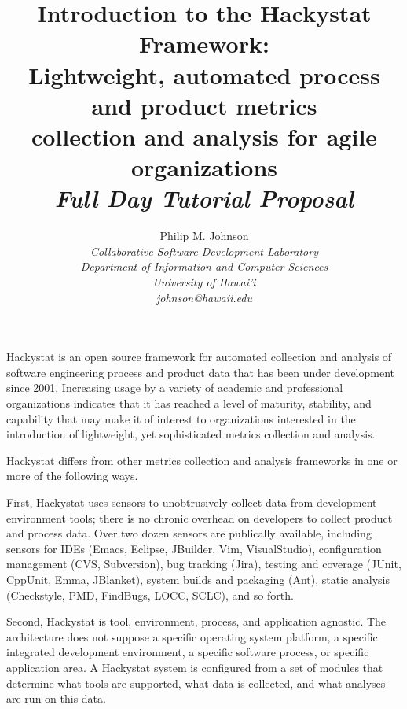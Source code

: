 \documentclass[11pt,twocolumn]{article}
\begin{document}
\title{Introduction to the Hackystat Framework:\\
Lightweight, automated process and product metrics \\
collection and analysis for agile organizations\\ \medskip
\em Full Day Tutorial Proposal}

\author{
Philip M. Johnson\\
\em  Collaborative Software Development Laboratory \\
\em  Department of Information and Computer Sciences \\
\em  University of Hawai'i \\
\em  johnson@hawaii.edu}
\maketitle
\thispagestyle{empty}



Hackystat is an open source framework for automated collection and analysis
of software engineering process and product data that has been under
development since 2001. Increasing usage by a variety of academic and professional 
organizations indicates that it has reached a level of maturity, stability, 
and capability that may make it of interest to organizations interested in 
the introduction of lightweight, yet sophisticated metrics collection and analysis.

Hackystat differs from other metrics collection and analysis frameworks in
one or more of the following ways.

First, Hackystat uses sensors to unobtrusively collect data from development
environment tools; there is no chronic overhead on developers to collect
product and process data. Over two dozen sensors are publically available,
including sensors for IDEs (Emacs, Eclipse, JBuilder, Vim, VisualStudio),
configuration management (CVS, Subversion), bug tracking (Jira), testing
and coverage (JUnit, CppUnit, Emma, JBlanket), system builds and packaging
(Ant), static analysis (Checkstyle, PMD, FindBugs, LOCC, SCLC), and so
forth.

Second, Hackystat is tool, environment, process, and application
agnostic. The architecture does not suppose a specific operating system
platform, a specific integrated development environment, a specific
software process, or specific application area. A Hackystat system is
configured from a set of modules that determine what tools are supported,
what data is collected, and what analyses are run on this data.
\end{document}
